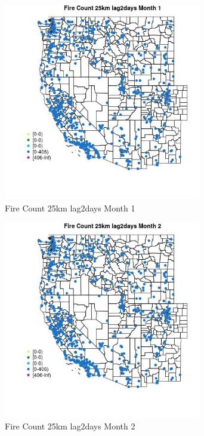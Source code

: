 \begin{figure} 
\centering  
\includegraphics[width=0.77\textwidth]{Code_Outputs/Report_ML_input_PM25_Step4_part_f_de_duplicated_aves_prioritize_24hr_obswNAs_MapObsMo1Fire_Count_25km_lag2days.jpg} 
\caption{\label{fig:Report_ML_input_PM25_Step4_part_f_de_duplicated_aves_prioritize_24hr_obswNAsMapObsMo1Fire_Count_25km_lag2days}Fire Count 25km lag2days Month 1} 
\end{figure} 
 

\clearpage 

\begin{figure} 
\centering  
\includegraphics[width=0.77\textwidth]{Code_Outputs/Report_ML_input_PM25_Step4_part_f_de_duplicated_aves_prioritize_24hr_obswNAs_MapObsMo2Fire_Count_25km_lag2days.jpg} 
\caption{\label{fig:Report_ML_input_PM25_Step4_part_f_de_duplicated_aves_prioritize_24hr_obswNAsMapObsMo2Fire_Count_25km_lag2days}Fire Count 25km lag2days Month 2} 
\end{figure} 
 

